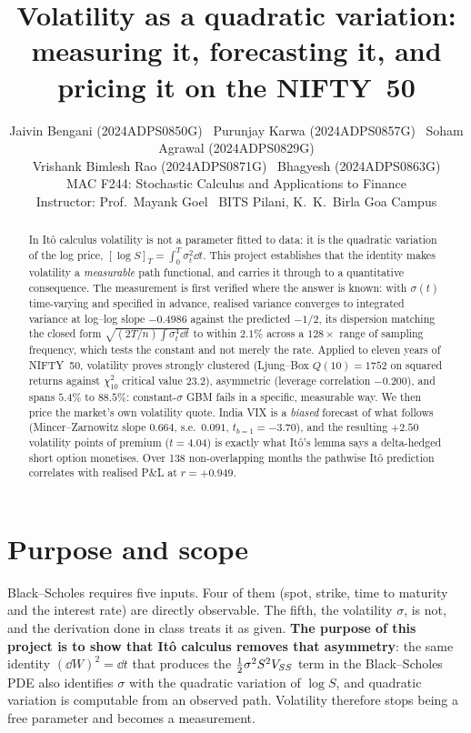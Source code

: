 \documentclass[10pt,a4paper]{article}
\title{\vspace{-2.7cm}\textbf{Volatility as a quadratic variation:\\
measuring it, forecasting it, and pricing it on the NIFTY~50}}
\author{%
\small Jaivin Bengani (2024ADPS0850G) \textbullet\ Purunjay Karwa (2024ADPS0857G) \textbullet\ Soham Agrawal (2024ADPS0829G)\\
\small Vrishank Bimlesh Rao (2024ADPS0871G) \textbullet\ Bhagyesh (2024ADPS0863G)\\[2pt]
MAC F244: Stochastic Calculus and Applications to Finance\\
\small Instructor: Prof.\ Mayank Goel \textbullet\ BITS Pilani, K.\ K.\ Birla Goa Campus}
\date{}
\begin{document}
\maketitle
\vspace{-0.85cm}

\begin{abstract}\small
\noindent
In It\^o calculus volatility is not a parameter fitted to data: it is the quadratic variation
of the log price, $[\log S]_T=\int_0^T\sigma_t^2\dd t$. This project establishes that the
identity makes volatility a \emph{measurable} path functional, and carries it through to a
quantitative consequence. The measurement is first verified where the answer is known: with
$\sigma(t)$ time-varying and specified in advance, realised variance converges to integrated
variance at log--log slope $-0.4986$ against the predicted $-1/2$, its dispersion matching the
closed form $\sqrt{(2T/n)\!\int\!\sigma_t^4\dd t}$ to within $2.1\%$ across a $128\times$ range
of sampling frequency, which tests the constant and not merely the rate. Applied to eleven years of NIFTY~50, volatility proves strongly clustered (Ljung--Box
$Q(10)=1752$ on squared returns against $\chi^2_{10}$ critical value $23.2$), asymmetric
(leverage correlation $-0.200$), and spans $5.4\%$ to $88.5\%$: constant-$\sigma$ GBM fails in
a specific, measurable way. We then price the market's own volatility quote. India VIX is a
\emph{biased} forecast of what follows (Mincer--Zarnowitz slope $0.664$, s.e.\ $0.091$,
$t_{b=1}=-3.70$), and the resulting $+2.50$ volatility points of premium ($t=4.04$) is exactly
what It\^o's lemma says a delta-hedged short option monetises. Over 138 non-overlapping
months the pathwise It\^o prediction correlates with realised P\&L at $r=+0.949$.
\end{abstract}
\vspace{-0.2cm}

\section{Purpose and scope}

Black--Scholes requires five inputs. Four of them (spot, strike, time to maturity and the
interest rate) are directly observable. The fifth, the volatility $\sigma$, is not, and the
derivation done in class treats it as given. \textbf{The purpose of this project is to show
that It\^o calculus removes that asymmetry}: the same identity $(\dd W)^2=\dd t$ that produces
the $\tfrac{1}{2}\sigma^2S^2V_{SS}$ term in the Black--Scholes PDE also identifies $\sigma$ with the
quadratic variation of $\log S$, and quadratic variation is computable from an observed path.
Volatility therefore stops being a free parameter and becomes a measurement.
\end{document}
